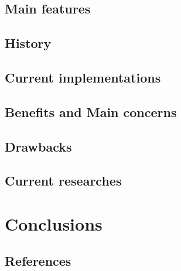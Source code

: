 \documentclass{article}
\begin{document}
\subsection{Main features}\label{principes-1}


\subsection{History}\label{historique-1}


\subsection{Current implementations}\label{implementations-1}


\subsection{Benefits and Main concerns}\label{benefices-1}


\subsection{Drawbacks}\label{desavanatages-1}


\subsection{Current researches}\label{recherches-1}


\section{Conclusions}\label{conclusions}


\begin{appendices}
\section{References}\label{references}


\end{appendices}
\end{document}
